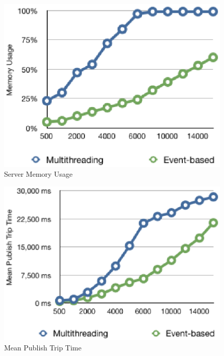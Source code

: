 \begin{figure}[htb!]
\centering%
    \includegraphics[scale=0.70]{figures/et_memory.eps}
    \caption{Server Memory Usage}
    \label{fig:et_memory}
\end{figure}

\begin{figure}[htb!]
\centering%
    \includegraphics[scale=0.70]{figures/et_latency.eps}
    \caption{Mean Publish Trip Time}
    \label{fig:et_latency}
\end{figure}

